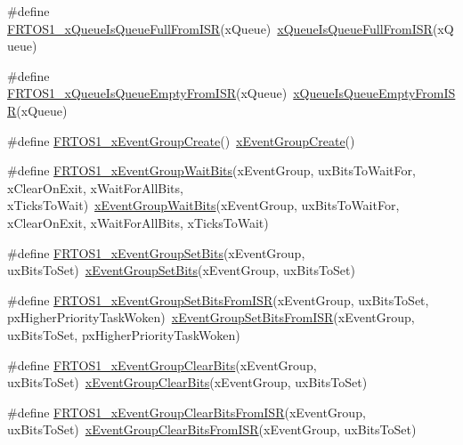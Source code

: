 \begin{DoxyCompactItemize}
\item 
\#define \hyperlink{group___f_r_t_o_s1__module_gacd5e9efd0bfea7b8f039e35005631439}{F\+R\+T\+O\+S1\+\_\+x\+Queue\+Is\+Queue\+Full\+From\+I\+SR}(x\+Queue)~\hyperlink{queue_8h_a81319b3aa562733957c5a12a088516d3}{x\+Queue\+Is\+Queue\+Full\+From\+I\+SR}(x\+Queue)
\item 
\#define \hyperlink{group___f_r_t_o_s1__module_gaf9752f7b1658c9ca5975583fa5e7cc5a}{F\+R\+T\+O\+S1\+\_\+x\+Queue\+Is\+Queue\+Empty\+From\+I\+SR}(x\+Queue)~\hyperlink{queue_8h_aa11139c58f4eecaa0c50078f2976d010}{x\+Queue\+Is\+Queue\+Empty\+From\+I\+SR}(x\+Queue)
\item 
\#define \hyperlink{group___f_r_t_o_s1__module_ga8a23ed0874763be44263ff417691b7f0}{F\+R\+T\+O\+S1\+\_\+x\+Event\+Group\+Create}()~\hyperlink{event__groups_8c_a2e8622ce280fff2f60ad867dff0a4519}{x\+Event\+Group\+Create}()
\item 
\#define \hyperlink{group___f_r_t_o_s1__module_gaaaf9b14121ed276e0f561a5a8e1cc861}{F\+R\+T\+O\+S1\+\_\+x\+Event\+Group\+Wait\+Bits}(x\+Event\+Group,  ux\+Bits\+To\+Wait\+For,  x\+Clear\+On\+Exit,  x\+Wait\+For\+All\+Bits,  x\+Ticks\+To\+Wait)~\hyperlink{event__groups_8h_aab9d5b405bc57b7624dcabe9a9a503db}{x\+Event\+Group\+Wait\+Bits}(x\+Event\+Group, ux\+Bits\+To\+Wait\+For, x\+Clear\+On\+Exit, x\+Wait\+For\+All\+Bits, x\+Ticks\+To\+Wait)
\item 
\#define \hyperlink{group___f_r_t_o_s1__module_gacfc13f0806c012d7ce1f45a53652e8d8}{F\+R\+T\+O\+S1\+\_\+x\+Event\+Group\+Set\+Bits}(x\+Event\+Group,  ux\+Bits\+To\+Set)~\hyperlink{event__groups_8h_a02d7b3bb55f7e11d9c47116266c5fb2e}{x\+Event\+Group\+Set\+Bits}(x\+Event\+Group, ux\+Bits\+To\+Set)
\item 
\#define \hyperlink{group___f_r_t_o_s1__module_ga026d10dcfbf5bb1c651994daeca7d015}{F\+R\+T\+O\+S1\+\_\+x\+Event\+Group\+Set\+Bits\+From\+I\+SR}(x\+Event\+Group,  ux\+Bits\+To\+Set,  px\+Higher\+Priority\+Task\+Woken)~\hyperlink{event__groups_8h_a62b68278abac6358369ae8e390988a02}{x\+Event\+Group\+Set\+Bits\+From\+I\+SR}(x\+Event\+Group, ux\+Bits\+To\+Set, px\+Higher\+Priority\+Task\+Woken)
\item 
\#define \hyperlink{group___f_r_t_o_s1__module_ga41690bf5d30d550652e67350237c6585}{F\+R\+T\+O\+S1\+\_\+x\+Event\+Group\+Clear\+Bits}(x\+Event\+Group,  ux\+Bits\+To\+Set)~\hyperlink{event__groups_8h_a0fb72cfdd4f0d5f86d955fc3af448f2a}{x\+Event\+Group\+Clear\+Bits}(x\+Event\+Group, ux\+Bits\+To\+Set)
\item 
\#define \hyperlink{group___f_r_t_o_s1__module_ga130498ee79ddbd8867a976cf384a47b2}{F\+R\+T\+O\+S1\+\_\+x\+Event\+Group\+Clear\+Bits\+From\+I\+SR}(x\+Event\+Group,  ux\+Bits\+To\+Set)~\hyperlink{event__groups_8h_a3d7de214a697f33fe7b914e26a93f33a}{x\+Event\+Group\+Clear\+Bits\+From\+I\+SR}(x\+Event\+Group, ux\+Bits\+To\+Set)

\end{DoxyCompactItemize}
